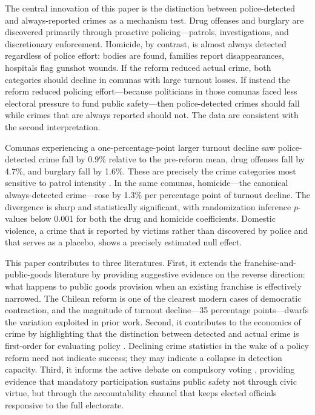 \documentclass[12pt]{article}
\begin{document}
The central innovation of this paper is the distinction between police-detected and always-reported crimes as a mechanism test. Drug offenses and burglary are discovered primarily through proactive policing---patrols, investigations, and discretionary enforcement. Homicide, by contrast, is almost always detected regardless of police effort: bodies are found, families report disappearances, hospitals flag gunshot wounds. If the reform reduced actual crime, both categories should decline in comunas with large turnout losses. If instead the reform reduced policing effort---because politicians in those comunas faced less electoral pressure to fund public safety---then police-detected crimes should fall while crimes that are always reported should not. The data are consistent with the second interpretation.

Comunas experiencing a one-percentage-point larger turnout decline saw police-detected crime fall by 0.9\% relative to the pre-reform mean, drug offenses fall by 4.7\%, and burglary fall by 1.6\%. These are precisely the crime categories most sensitive to patrol intensity \citep{Chalfin2018,Levitt1997}. In the same comunas, homicide---the canonical always-detected crime---rose by 1.3\% per percentage point of turnout decline. The divergence is sharp and statistically significant, with randomization inference $p$-values below 0.001 for both the drug and homicide coefficients. Domestic violence, a crime that is reported by victims rather than discovered by police and that serves as a placebo, shows a precisely estimated null effect.

This paper contributes to three literatures. First, it extends the franchise-and-public-goods literature \citep{Fujiwara2015,Leon2017,Miller2008,Cascio2014,Lott1999} by providing suggestive evidence on the reverse direction: what happens to public goods provision when an existing franchise is effectively narrowed. The Chilean reform is one of the clearest modern cases of democratic contraction, and the magnitude of turnout decline---35 percentage points---dwarfs the variation exploited in prior work. Second, it contributes to the economics of crime by highlighting that the distinction between detected and actual crime is first-order for evaluating policy \citep{Levitt1997,DiTella2004,Hoffman2017}. Declining crime statistics in the wake of a policy reform need not indicate success; they may indicate a collapse in detection capacity. Third, it informs the active debate on compulsory voting \citep{Fowler2013,Funk2010,Bechtel2016}, providing evidence that mandatory participation sustains public safety not through civic virtue, but through the accountability channel that keeps elected officials responsive to the full electorate.
\end{document}
